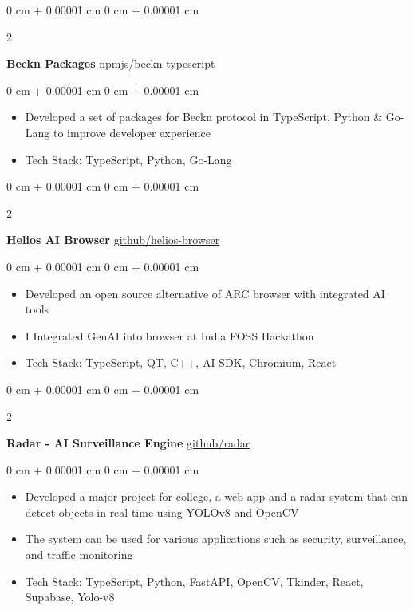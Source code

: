 \documentclass[10pt, letterpaper]{article}
\newenvironment{highlights}{
    \begin{itemize}[
        topsep=0.10 cm,
        parsep=0.10 cm,
        partopsep=0pt,
        itemsep=0pt,
        leftmargin=0 cm + 10pt
    ]
}{
    \end{itemize}
} %
\newenvironment{onecolentry}{
    \begin{adjustwidth}{
        0 cm + 0.00001 cm
    }{
        0 cm + 0.00001 cm
    }
}{
    \end{adjustwidth}
} %
\newenvironment{twocolentry}[2][]{
    \onecolentry
    \def\secondColumn{#2}
    \setcolumnwidth{\fill, 4.5 cm}
    \begin{paracol}{2}
}{
    \switchcolumn \raggedleft \secondColumn
    \end{paracol}
    \endonecolentry
} %
\begin{document}
\vspace{0.2 cm}

\begin{twocolentry}{
		\href{https://github.com/rajatsandeepsen/beckn-typescript}{npmjs/beckn-typescript}
	}
	\textbf{Beckn Packages}\end{twocolentry}

\vspace{0.10 cm}
\begin{onecolentry}
	\begin{highlights}
		\item Developed a set of packages for Beckn protocol in TypeScript, Python \& Go-Lang
		to improve developer experience
		\item Tech Stack: TypeScript, Python, Go-Lang
	\end{highlights}
\end{onecolentry}

\vspace{0.2 cm}

\begin{twocolentry}{
		\href{https://github.com/Milansuman/Helios-Browser}{github/helios-browser}
	}
	\textbf{Helios AI Browser}\end{twocolentry}

\vspace{0.10 cm}
\begin{onecolentry}
	\begin{highlights}
		\item Developed an open source alternative of ARC browser with integrated AI tools
		\item I Integrated GenAI into browser at India FOSS Hackathon
		\item Tech Stack: TypeScript, QT, C++, AI-SDK, Chromium, React
	\end{highlights}
\end{onecolentry}

\vspace{0.2 cm}

\begin{twocolentry}{
		\href{https://github.com/rajatsandeepsen/radar}{github/radar}
	}
	\textbf{Radar - AI Surveillance Engine}\end{twocolentry}

\vspace{0.10 cm}
\begin{onecolentry}
	\begin{highlights}
		\item Developed a major project for college, a web-app and a radar system that can
		detect objects in real-time using YOLOv8 and OpenCV
		\item The system can be used for various applications such as security, surveillance,
		and traffic monitoring
		\item Tech Stack: TypeScript, Python, FastAPI, OpenCV, Tkinder, React, Supabase,
		Yolo-v8
	\end{highlights}
\end{onecolentry}
\end{document}
